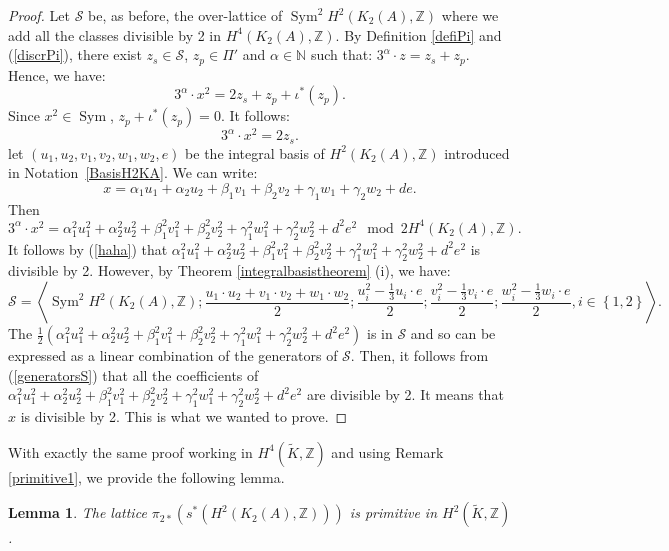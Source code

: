 \documentclass{alggeom}
\DeclareMathOperator{\Sym}{Sym}
\newcommand{\Z}{\mathbb{Z}}
\newcommand{\F}{\mathbb{F}_{2}}
\theoremstyle{plain}
\newtheorem{lemme}[theorem]{Lemma}
\theoremstyle{definition}
\theoremstyle{remark}
\begin{document}
\begin{proof}
Let $\mathcal{S}$ be, as before, the over-lattice of $\Sym^{2} H^{2}(K_{2}(A),\Z)$ where we add all the classes divisible by 2 in $H^{4}(K_{2}(A),\Z)$.
By Definition \ref{defiPi} and (\ref{discrPi}), there exist $z_{s}\in \mathcal{S}$, $z_{p}\in \Pi'$ and $\alpha\in \mathbb{N}$ such that:
$3^\alpha\cdot z= z_{s}+z_{p}$. 
Hence, we have:
$$3^\alpha\cdot x^2=2z_{s}+z_{p}+\iota^{*}(z_{p}).$$
Since $x^2\in \Sym$, $z_{p}+\iota^{*}(z_{p})=0$.
It follows:
\begin{equation}
3^\alpha\cdot x^2=2z_{s}.
\label{haha}
\end{equation}
let $(u_{1},u_{2},v_{1},v_{2},w_{1},w_{2},e)$ be the integral basis of $H^{2}(K_{2}(A),\Z)$ introduced in Notation~\ref{BasisH2KA}.
We can write:
$$x=\alpha_{1}u_{1}+\alpha_{2}u_{2}+\beta_{1}v_{1}+\beta_{2}v_{2}+\gamma_{1}w_{1}+\gamma_{2}w_{2}+de.$$
Then $$3^\alpha\cdot x^{2}=\alpha_{1}^{2}u_{1}^{2}+\alpha_{2}^{2}u_{2}^{2}+\beta_{1}^{2}v_{1}^{2}+\beta_{2}^{2}v_{2}^{2}+\gamma_{1}^{2}w_{1}^{2}+\gamma_{2}^{2}w_{2}^{2}+d^{2}e^{2}\mod 2H^{4}(K_{2}(A),\Z).$$
It follows by (\ref{haha}) that 
$\alpha_{1}^{2}u_{1}^{2}+\alpha_{2}^{2}u_{2}^{2}+\beta_{1}^{2}v_{1}^{2}+\beta_{2}^{2}v_{2}^{2}+\gamma_{1}^{2}w_{1}^{2}+\gamma_{2}^{2}w_{2}^{2}+d^{2}e^{2}$ is divisible by 2.
However, by Theorem \ref{integralbasistheorem} (i), we have:
\begin{equation}
\mathcal{S}=\left\langle \Sym^2 H^{2}(K_{2}(A),\Z); \frac{u_{1}\cdot u_{2}+v_{1}\cdot v_{2}+w_{1}\cdot w_{2}}{2};\frac{u_{i}^{2}-\frac{1}{3}u_{i}\cdot e}{2};\frac{v_{i}^{2}-\frac{1}{3}v_{i}\cdot e}{2};\frac{w_{i}^{2}-\frac{1}{3}w_{i}\cdot e}{2},i\in\left\{1,2\right\}\right\rangle.
\label{generatorsS}
\end{equation}
The $\frac{1}{2}(\alpha_{1}^{2}u_{1}^{2}+\alpha_{2}^{2}u_{2}^{2}+\beta_{1}^{2}v_{1}^{2}+\beta_{2}^{2}v_{2}^{2}+\gamma_{1}^{2}w_{1}^{2}+\gamma_{2}^{2}w_{2}^{2}+d^{2}e^{2})$ is in $\mathcal{S}$ and so can be expressed as a linear combination of the generators of $\mathcal{S}$.
Then, it follows from (\ref{generatorsS}) that all the coefficients of $\alpha_{1}^{2}u_{1}^{2}+\alpha_{2}^{2}u_{2}^{2}+\beta_{1}^{2}v_{1}^{2}+\beta_{2}^{2}v_{2}^{2}+\gamma_{1}^{2}w_{1}^{2}+\gamma_{2}^{2}w_{2}^{2}+d^{2}e^{2}$ are divisible by 2.
It means that $x$ is divisible by 2. This is what we wanted to prove.
\end{proof}
With exactly the same proof working in $H^4(\widetilde{K},\Z)$ and using Remark \ref{primitive1}, we provide the following lemma.
\begin{lemme}\label{primitive2}
The lattice $\pi_{2*}(s^*(H^2(K_2(A),\Z)))$ is primitive in $H^2(\widetilde{K},\Z)$.
\end{lemme}
\end{document}

